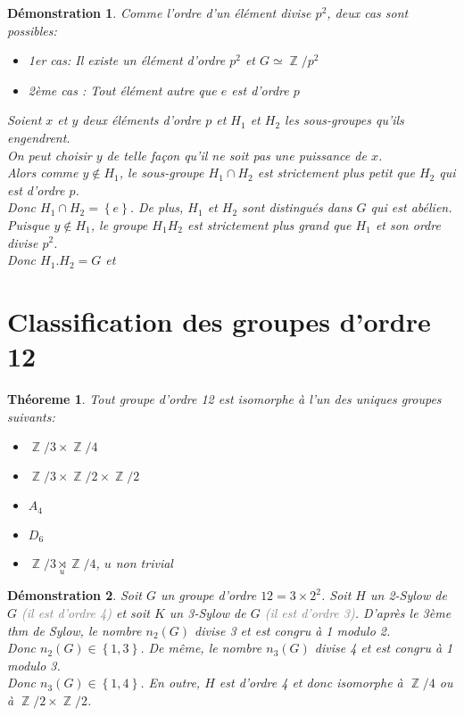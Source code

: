 \documentclass[a4paper, oneside]{report}
\theoremstyle{break}
\newtheorem{thm}{Théoreme}[section] %
\newtheorem*{demonstration}{Démonstration}
\newcommand{\gray}[1]{\textcolor{gray}{#1}}
\DeclareMathOperator{\Z}{\mathbb{Z}}
\DeclarePairedDelimiter\ens{\left\{ }{\right\} }%
\renewcommand{\ens}[1]{\left\{ #1 \right\} }%
\newcommand{\us}{\underset}
\begin{document}
\begin{demonstration}
Comme l'ordre d'un élément divise $p^2$, deux cas sont possibles:
\begin{itemize}
\item 1er cas: Il existe un élément d'ordre $p^2$ et $G \simeq \Z/p^2$

\item 2ème cas : Tout élément autre que $e$ est d'ordre $p$
\end{itemize}
Soient $x$ et $y$ deux éléments d'ordre $p$ et $H_1$ et $H_2$ les sous-groupes qu'ils engendrent.\\
On peut choisir $y$ de telle façon qu'il ne soit pas une puissance de $x$.\\
Alors comme $y \notin H_1$, le sous-groupe $H_1 \cap H_2$ est strictement plus petit que $H_2$ qui est d'ordre $p$.\\
Donc $H_1 \cap H_2 = \ens{e}$. De plus, $H_1$ et $H_2$ sont distingués dans $G$ qui est abélien.\\
Puisque $y \notin H_1$, le groupe $H_1 H_2$ est strictement plus grand que $H_1$ et son ordre divise $p^2$.\\
Donc $H_1 . H_2 = G$ et 
\end{demonstration}

\section{Classification des groupes d'ordre 12}

\begin{thm}
Tout groupe d'ordre 12 est isomorphe à l'un des uniques groupes suivants:
\begin{itemize}[label=$\bullet$]
\item $\Z/3 \times \Z/4$

\item $\Z/3 \times \Z/2 \times \Z/2$

\item $A_4$

\item $D_6$

\item $\Z/3 \us{u}{\rtimes} \Z/4$, $u$ non trivial
\end{itemize}
\end{thm}

\begin{demonstration}
Soit $G$ un groupe d'ordre $12 = 3 \times 2^2$. Soit $H$ un 2-Sylow de $G$ \gray{(il est d'ordre 4)} et soit $K$ un 3-Sylow de $G$ \gray{(il est d'ordre 3)}. D'après le 3ème thm de Sylow, le nombre $n_2(G)$ divise 3 et est congru à 1 modulo 2.\\
Donc $n_2(G) \in \ens{1, 3}$. De même, le nombre $n_3(G)$ divise 4 et est congru à 1 modulo 3.\\
Donc $n_3(G) \in \ens{1, 4}$. En outre, $H$ est d'ordre 4 et donc isomorphe à $\Z/4$ ou à $\Z/2 \times \Z/2$.
\end{demonstration}
\end{document}
